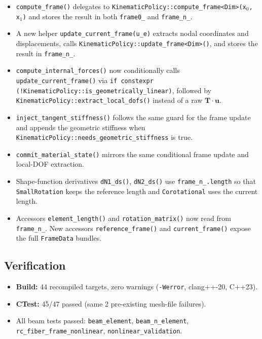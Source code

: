 \begin{itemize}
  \item \texttt{compute\_frame()} delegates to
    \texttt{KinematicPolicy::compute\-\_frame<Dim>(x$_0$, x$_1$)}
    and stores the result in both \texttt{frame0\_} and
    \texttt{frame\_n\_}.

  \item A new helper \texttt{update\_current\_frame(u\_e)} extracts
    nodal coordinates and displacements, calls
    \texttt{KinematicPolicy::update\_frame<Dim>()}, and stores the
    result in \texttt{frame\_n\_}.

  \item \texttt{compute\_internal\_forces()} now conditionally calls
    \texttt{update\_current\_frame()} via
    \texttt{if constexpr (!KinematicPolicy::is\_geometrically\_linear)},
    followed by
    \texttt{KinematicPolicy::extract\_local\_dofs()} instead of a
    raw $\mathbf{T}\cdot\mathbf{u}$.

  \item \texttt{inject\_tangent\_stiffness()} follows the same guard
    for the frame update and appends the geometric stiffness when
    \texttt{KinematicPolicy::needs\_geometric\_stiffness} is true.

  \item \texttt{commit\_material\_state()} mirrors the same
    conditional frame update and local-DOF extraction.

  \item Shape-function derivatives \texttt{dN1\_ds()}, \texttt{dN2\_ds()}
    use \texttt{frame\_n\_.length} so that \texttt{SmallRotation}
    keeps the reference length and \texttt{Corotational} uses the
    current length.

  \item Accessors \texttt{element\_length()} and
    \texttt{rotation\_matrix()} now read from \texttt{frame\_n\_}.
    New accessors \texttt{reference\_frame()} and
    \texttt{current\_frame()} expose the full \texttt{FrameData}
    bundles.
\end{itemize}

\subsection{Verification}

\begin{itemize}
  \item \textbf{Build:} 44 recompiled targets, zero warnings
        (\texttt{-Werror}, clang++-20, C++23).
  \item \textbf{CTest:} 45/47 passed (same 2 pre-existing mesh-file
        failures).
  \item All beam tests passed:
        \texttt{beam\_element},
        \texttt{beam\_n\_element},
        \texttt{rc\_fiber\_frame\_nonlinear},
        \texttt{nonlinear\_validation}.
\end{itemize}



